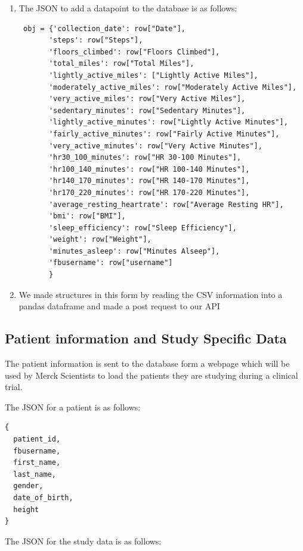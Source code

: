 \documentclass[]{book}
\begin{document}
\begin{enumerate}
\def\labelenumi{\arabic{enumi}.}
\item
  The JSON to add a datapoint to the database is as follows:

\begin{verbatim}
 obj = {'collection_date': row["Date"],
       'steps': row["Steps"],
       'floors_climbed': row["Floors Climbed"],
       'total_miles': row["Total Miles"],
       'lightly_active_miles': ["Lightly Active Miles"],
       'moderately_active_miles': row["Moderately Active Miles"],
       'very_active_miles': row["Very Active Miles"],
       'sedentary_minutes': row["Sedentary Minutes"],
       'lightly_active_minutes': row["Lightly Active Minutes"],
       'fairly_active_minutes': row["Fairly Active Minutes"],
       'very_active_minutes': row["Very Active Minutes"],
       'hr30_100_minutes': row["HR 30-100 Minutes"],
       'hr100_140_minutes': row["HR 100-140 Minutes"],
       'hr140_170_minutes': row["HR 140-170 Minutes"],
       'hr170_220_minutes': row["HR 170-220 Minutes"],
       'average_resting_heartrate': row["Average Resting HR"],
       'bmi': row["BMI"],
       'sleep_efficiency': row["Sleep Efficiency"],
       'weight': row["Weight"],
       'minutes_asleep': row["Minutes Alseep"],
       'fbusername': row["username"]
       }
\end{verbatim}
\item
  We made structures in this form by reading the CSV information into a
  pandas dataframe and made a post request to our API
\end{enumerate}

\subsection{Patient information and Study Specific
Data}\label{patient-information-and-study-specific-data}

The patient information is sent to the database form a webpage which
will be used by Merck Scientists to load the patients they are studying
during a clinical trial.

The JSON for a patient is as follows:

\begin{verbatim}
{
  patient_id,
  fbusername,
  first_name,
  last_name,
  gender,
  date_of_birth,
  height
}
\end{verbatim}

The JSON for the study data is as follows:
\end{document}
